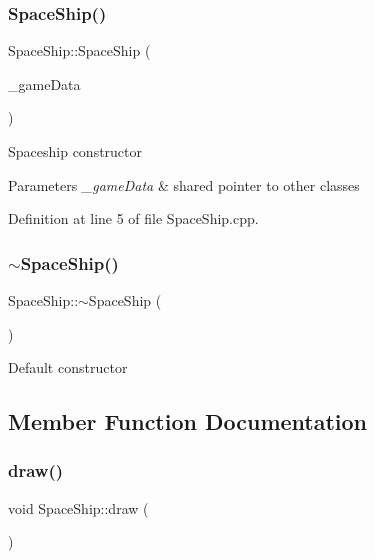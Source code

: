 \subsubsection{\texorpdfstring{SpaceShip()}{SpaceShip()}}
{\footnotesize\ttfamily Space\+Ship\+::\+Space\+Ship (\begin{DoxyParamCaption}\item[{\mbox{\hyperlink{_engine_8h_a5bbe002e9f7f45a67e8fda9dbe980a3f}{Game\+Data}}}]{\+\_\+game\+Data }\end{DoxyParamCaption})\hspace{0.3cm}{\ttfamily [explicit]}}

Spaceship constructor 
\begin{DoxyParams}{Parameters}
{\em \+\_\+game\+Data} & shared pointer to other classes \\
\hline
\end{DoxyParams}


Definition at line 5 of file Space\+Ship.\+cpp.

\mbox{\label{class_space_ship_a2bf6798a10a1a26ecd0bfbef6bea076d}} 
\subsubsection{\texorpdfstring{$\sim$SpaceShip()}{~SpaceShip()}}
{\footnotesize\ttfamily Space\+Ship\+::$\sim$\+Space\+Ship (\begin{DoxyParamCaption}{ }\end{DoxyParamCaption})\hspace{0.3cm}{\ttfamily [default]}}

Default constructor 

\subsection{Member Function Documentation}
\mbox{\label{class_space_ship_aa101a4a70560fe739f6b5d15d5ca9294}} 
\subsubsection{\texorpdfstring{draw()}{draw()}}
{\footnotesize\ttfamily void Space\+Ship\+::draw (\begin{DoxyParamCaption}{ }\end{DoxyParamCaption})}

